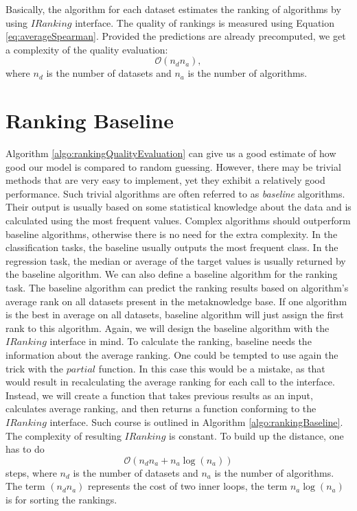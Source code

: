Basically, the algorithm for each dataset estimates the ranking of algorithms by using $IRanking$ interface. The quality of rankings is measured using Equation \ref{eq:averageSpearman}. Provided the predictions are already precomputed, we get a complexity of the quality evaluation: $$\mathcal{O}(n_dn_a),$$
where $n_d$ is the number of datasets and $n_a$ is the number of algorithms.

\section{Ranking Baseline}
\label{section:baseline}
Algorithm \ref{algo:rankingQualityEvaluation} can give us a good estimate of how good our model is compared to random guessing. However, there may be trivial methods that are very easy to implement, yet they exhibit a relatively good performance. Such trivial algorithms are often referred to as \emph{baseline} algorithms. Their output is usually based on some statistical knowledge about the data and is calculated using the most frequent values. Complex algorithms should outperform baseline algorithms, otherwise there is no need for the extra complexity.
In the classification tasks, the baseline usually outputs the most frequent class. In the regression task, the median or average of the target values is usually returned by the baseline algorithm. We can also define a baseline algorithm for the ranking task. The baseline algorithm can predict the ranking results based on algorithm's average rank on all datasets present in the metaknowledge base. If one algorithm is the best in average on all datasets, baseline algorithm will just assign the first rank to this algorithm. Again, we will design the baseline algorithm with the $IRanking$ interface in mind. To calculate the ranking, baseline needs the information about the average ranking. One could be tempted to use again the trick with the $partial$ function. In this case this would be a mistake, as that would result in recalculating the average ranking for each call to the interface. Instead, we will create a function that takes previous results as an input, calculates average ranking, and then returns a function conforming to the $IRanking$ interface. Such course is outlined in Algorithm \ref{algo:rankingBaseline}. The complexity of resulting $IRanking$ is constant. To build up the distance, one has to do $$\mathcal{O}(n_dn_a + n_a\log(n_a))$$
steps, where $n_d$ is the number of datasets and $n_a$ is the number of algorithms. The term $(n_dn_a)$ represents the cost of two inner loops, the term $n_a\log(n_a)$ is for sorting the rankings.

